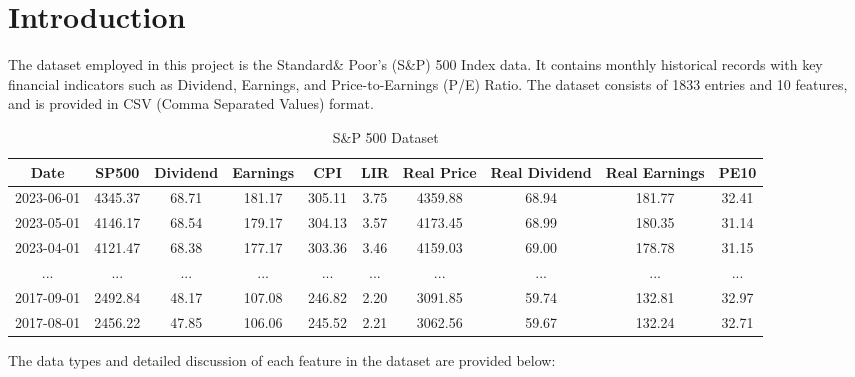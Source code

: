 \documentclass[a4paper,12pt]{report}
\begin{document}
\section{Introduction}
The dataset employed in this project is the Standard\& Poor’s (S\&P) 500 Index data. It contains monthly historical records with key financial indicators such as Dividend, Earnings, and Price-to-Earnings (P/E) Ratio. The dataset consists of 1833 entries and 10 features, and is provided in CSV (Comma Separated Values) format.
\begin{table}[H]
\centering
\begin{adjustbox}{width=\textwidth}
\begin{tabular}{|c|c|c|c|c|c|c|c|c|c|}
\hline
\textbf{Date} & \textbf{SP500} & \textbf{Dividend} & \textbf{Earnings} & \textbf{CPI} & \textbf{LIR} & \textbf{Real Price} & \textbf{Real Dividend} & \textbf{Real Earnings} & \textbf{PE10}\\
\hline
2023-06-01 & 4345.37 & 68.71 & 181.17 & 305.11 & 3.75 & 4359.88 & 68.94 & 181.77 & 32.41 \\
2023-05-01 & 4146.17 & 68.54 & 179.17 & 304.13 & 3.57 & 4173.45 & 68.99 & 180.35 & 31.14 \\
2023-04-01 & 4121.47 & 68.38 & 177.17 & 303.36 & 3.46 & 4159.03 & 69.00 & 178.78 & 31.15 \\
...&...&...&...&...&...&...&...&...&...\\
2017-09-01 & 2492.84 & 48.17 & 107.08 & 246.82 & 2.20 & 3091.85 & 59.74 & 132.81 & 32.97 \\
2017-08-01 & 2456.22 & 47.85 & 106.06 & 245.52 & 2.21 & 3062.56 & 59.67 & 132.24 & 32.71 \\
\hline
\end{tabular}
\end{adjustbox}
\caption{S\&P 500 Dataset}
\end{table}
The data types and detailed discussion of each feature in the dataset are provided below:
\end{document}
